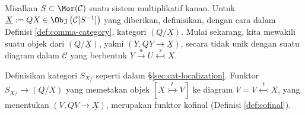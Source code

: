 \begin{lema}\label{prop:injective-localization-prep}
	Misalkan $S \subset \Mor(\mathcal{C})$ suatu sistem multiplikatif kanan.
	Untuk $\underline{X} := QX \in
	\Obj\left(\mathcal{C}[S^{-1}]\right)$ yang diberikan, definisikan, dengan
	cara dalam Definisi \ref{def:comma-category}, kategori
	$(Q/\underline{X})$. Mulai sekarang, kita mewakili suatu objek dari
	$(Q/\underline{X})$, yakni $(Y, QY \to \underline{X})$, secara tidak
	unik dengan suatu diagram dalam $\mathcal{C}$ yang berbentuk
	$Y \xrightarrow{a} U \stackrel{s}{\leftarrowtail} X$.

	Definisikan kategori $S_{X/}$ seperti dalam
	\S\ref{sec:cat-localization}. Funktor $S_{X/} \to (Q/\underline{X})$ yang
	memetakan objek $[X \stackrel{t}{\rightarrowtail} V]$ ke diagram
	$V = V \stackrel{t}{\leftarrowtail} X$, yang menentukan
	$(V, QV \to \underline{X})$, merupakan funktor kofinal
	(Definisi \ref{def:cofinal}).
\end{lema}
